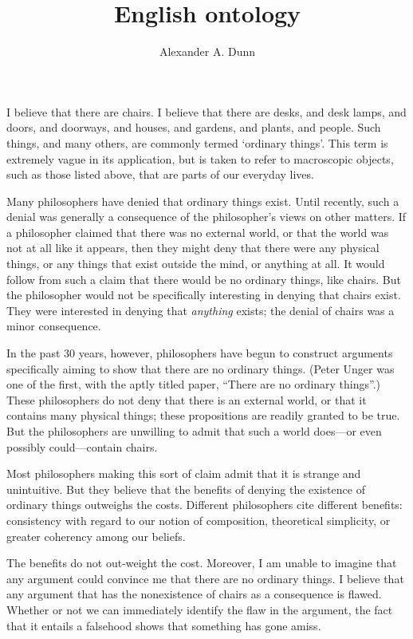 \documentclass[11pt]{article}
\title{English ontology}
\author{Alexander A. Dunn}
\begin{document}
\ifstandalone
\maketitle
\begin{spacing}{1.25}
\fi

I believe that there are chairs.  I believe that there are desks, and
desk lamps, and doors, and doorways, and houses, and gardens, and
plants, and people.  Such things, and many others, are commonly termed
`ordinary things'.  This term is extremely vague in its application,
but is taken to refer to macroscopic objects, such as those listed
above, that are parts of our everyday lives.

Many philosophers have denied that ordinary things exist.  Until
recently, such a denial was generally a consequence of the
philosopher's views on other matters.  If a philosopher claimed that
there was no external world, or that the world was not at all like it
appears, then they might deny that there were any physical things, or
any things that exist outside the mind, or anything at all.  It would
follow from such a claim that there would be no ordinary things, like
chairs.  But the philosopher would not be specifically interesting in
denying that chairs exist.  They were interested in denying that {\em
  anything} exists; the denial of chairs was a minor consequence.

In the past 30 years, however, philosophers have begun to construct
arguments specifically aiming to show that there are no ordinary
things.  (Peter Unger was one of the first, with the aptly titled
paper, ``There are no ordinary things''.)  These philosophers do not
deny that there is an external world, or that it contains many
physical things; these propositions are readily granted to be true.
But the philosophers are unwilling to admit that such a world
does---or even possibly could---contain chairs.

Most philosophers making this sort of claim admit that it is strange
and unintuitive.  But they believe that the benefits of denying the
existence of ordinary things outweighs the costs.  Different
philosophers cite different benefits: consistency with regard to our
notion of composition, theoretical simplicity, or greater coherency
among our beliefs.  

The benefits do not out-weight the cost.  Moreover, I am unable to
imagine that any argument could convince me that there are no ordinary
things.  I believe that any argument that has the nonexistence of
chairs as a consequence is flawed.  Whether or not we can immediately
identify the flaw in the argument, the fact that it entails a
falsehood shows that something has gone amiss.


\end{spacing}
\end{document}
